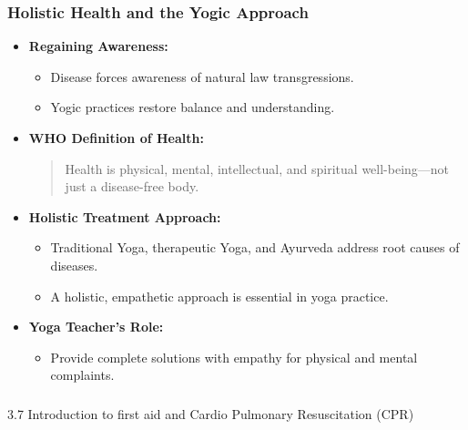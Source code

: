 \begin{frame}[fragile]\frametitle{Holistic Health and the Yogic Approach}

      \begin{itemize}
        \item \textbf{Regaining Awareness:}
        \begin{itemize}
            \item Disease forces awareness of natural law transgressions.
            \item Yogic practices restore balance and understanding.
        \end{itemize}
        \item \textbf{WHO Definition of Health:}
        \begin{quote}
        Health is physical, mental, intellectual, and spiritual well-being—not just a disease-free body.
        \end{quote}
        \item \textbf{Holistic Treatment Approach:}
        \begin{itemize}
            \item Traditional Yoga, therapeutic Yoga, and Ayurveda address root causes of diseases.
            \item A holistic, empathetic approach is essential in yoga practice.
        \end{itemize}
        \item \textbf{Yoga Teacher's Role:}
        \begin{itemize}
            \item Provide complete solutions with empathy for physical and mental complaints.
        \end{itemize}
      \end{itemize}

\end{frame}

\begin{frame}[fragile]\frametitle{}
\begin{center}
{\Large 3.7 Introduction to ﬁrst aid and Cardio Pulmonary Resuscitation (CPR)}
\end{center}
\end{frame}

